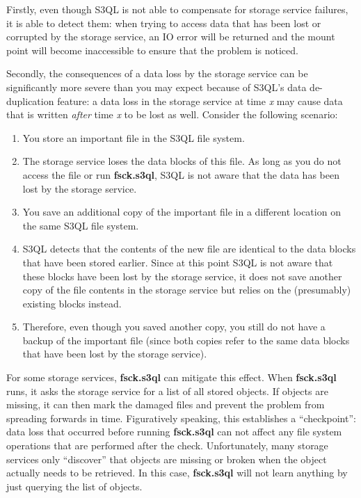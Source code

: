 \documentclass[letterpaper,10pt,english]{sphinxmanual}
\begin{document}
Firstly, even though S3QL is not able to compensate for storage
service failures, it is able to detect them: when trying to access
data that has been lost or corrupted by the storage service, an IO
error will be returned and the mount point will become inaccessible to
ensure that the problem is noticed.

Secondly, the consequences of a data loss by the storage service can
be significantly more severe than you may expect because of S3QL's
data de-duplication feature: a data loss in the storage service at
time \emph{x} may cause data that is written \emph{after} time \emph{x} to be lost as
well. Consider the following scenario:
\begin{enumerate}
\item {} 
You store an important file in the S3QL file system.

\item {} 
The storage service loses the data blocks of this file. As long as you
do not access the file or run \textbf{fsck.s3ql}, S3QL is not
aware that the data has been lost by the storage service.

\item {} 
You save an additional copy of the important file in a different
location on the same S3QL file system.

\item {} 
S3QL detects that the contents of the new file are identical to the
data blocks that have been stored earlier. Since at this point S3QL
is not aware that these blocks have been lost by the storage service, it
does not save another copy of the file contents in the storage service but
relies on the (presumably) existing blocks instead.

\item {} 
Therefore, even though you saved another copy, you still do not
have a backup of the important file (since both copies refer to the
same data blocks that have been lost by the storage service).

\end{enumerate}

For some storage services, \textbf{fsck.s3ql} can mitigate this
effect. When \textbf{fsck.s3ql} runs, it asks the storage service
for a list of all stored objects. If objects are missing, it can then
mark the damaged files and prevent the problem from spreading forwards
in time. Figuratively speaking, this establishes a ``checkpoint'': data
loss that occurred before running \textbf{fsck.s3ql} can not affect
any file system operations that are performed after the check.
Unfortunately, many storage services only ``discover'' that objects are
missing or broken when the object actually needs to be retrieved. In
this case, \textbf{fsck.s3ql} will not learn anything by just
querying the list of objects.
\end{document}
